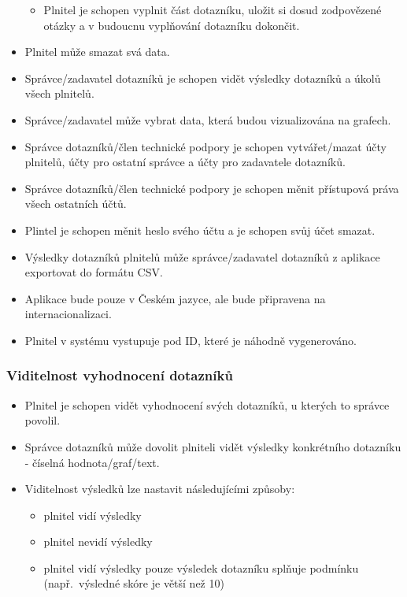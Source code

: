 \begin{itemize}
  \begin{itemize}
  \item
  Plnitel je schopen vyplnit část dotazníku, uložit si dosud zodpovězené otázky a v budoucnu vyplňování dotazníku dokončit.
  \end{itemize}
\item
Plnitel může smazat svá data.
\item
Správce/zadavatel dotazníků je schopen vidět výsledky dotazníků a úkolů všech plnitelů.
\item
  Správce/zadavatel může vybrat data, která budou vizualizována na grafech.
\item
Správce dotazníků/člen technické podpory je schopen vytvářet/mazat účty plnitelů, účty pro ostatní správce a účty pro zadavatele dotazníků.
\item
  Správce dotazníků/člen technické podpory je schopen měnit přístupová práva všech ostatních účtů.
\item
Plintel je schopen měnit heslo svého účtu a je schopen svůj účet smazat.
\item
Výsledky dotazníků plnitelů může správce/zadavatel dotazníků z aplikace exportovat do formátu CSV\@.
\item
  Aplikace bude pouze v Českém jazyce, ale bude připravena na internacionalizaci.
\item
Plnitel v systému vystupuje pod ID, které je náhodně vygenerováno.
\end{itemize}

\subsubsection{Viditelnost vyhodnocení dotazníků}\label{subsubsec:viditelnost-vyhodnoceni-dotazniku}

\begin{itemize}
\item
Plnitel je schopen vidět vyhodnocení svých dotazníků, u kterých to správce povolil.
\item
Správce dotazníků může dovolit plniteli vidět výsledky konkrétního dotazníku - číselná hodnota/graf/text.
\item
  Viditelnost výsledků lze nastavit následujícími způsoby:

  \begin{itemize}
  \item
  plnitel vidí výsledky
  \item
  plnitel nevidí výsledky
  \item
  plnitel vidí výsledky pouze výsledek dotazníku splňuje podmínku (např.\ výsledné skóre je větší než 10)
  \end{itemize}
\end{itemize}



